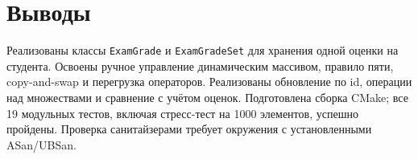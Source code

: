 \section{Выводы}

Реализованы классы \texttt{ExamGrade} и \texttt{ExamGradeSet} для хранения одной оценки на студента. Освоены ручное управление динамическим массивом, правило пяти, copy-and-swap и перегрузка операторов. Реализованы обновление по id, операции над множествами и сравнение с учётом оценок. Подготовлена сборка CMake; все 19 модульных тестов, включая стресс-тест на 1000 элементов, успешно пройдены. Проверка санитайзерами требует окружения с установленными ASan/UBSan.
